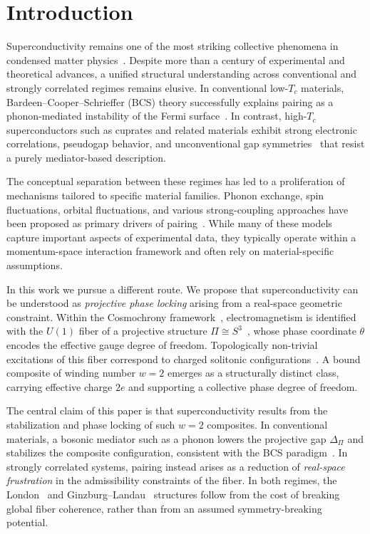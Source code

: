 \section{Introduction}
  \label{sec:introduction}

  Superconductivity remains one of the most striking collective phenomena in condensed matter
  physics~\cite{MeissnerOchsenfeld1933,LondonLondon1935}.
  Despite more than a century of experimental and theoretical advances,
  a unified structural understanding across conventional and strongly correlated regimes
  remains elusive.
  In conventional low-$T_c$ materials, Bardeen--Cooper--Schrieffer (BCS) theory
  successfully explains pairing as a phonon-mediated instability of the Fermi surface~\cite{BCS1957}.
  In contrast, high-$T_c$ superconductors such as cuprates and related materials
  exhibit strong electronic correlations, pseudogap behavior,
  and unconventional gap symmetries~\cite{Timusk1999Pseudogap,Tsuei2000Dwave}
  that resist a purely mediator-based description.

  The conceptual separation between these regimes has led to
  a proliferation of mechanisms tailored to specific material families.
  Phonon exchange, spin fluctuations, orbital fluctuations,
  and various strong-coupling approaches
  have been proposed as primary drivers of pairing~\cite{Scalapino2012SpinFluctuations}.
  While many of these models capture important aspects of experimental data,
  they typically operate within a momentum-space interaction framework
  and often rely on material-specific assumptions.

  In this work we pursue a different route.
  We propose that superconductivity can be understood as
  \emph{projective phase locking}
  arising from a real-space geometric constraint.
  Within the Cosmochrony framework~\cite{CosmochronyMain},
  electromagnetism is identified with the $U(1)$ fiber
  of a projective structure $\Pi \cong S^3$~\cite{CosmochronySpectral},
  whose phase coordinate $\theta$
  encodes the effective gauge degree of freedom.
  Topologically non-trivial excitations of this fiber
  correspond to charged solitonic configurations~\cite{CosmochronyBornInfeld}.
  A bound composite of winding number $w=2$
  emerges as a structurally distinct class,
  carrying effective charge $2e$ and supporting
  a collective phase degree of freedom.

  The central claim of this paper is that superconductivity
  results from the stabilization and phase locking
  of such $w=2$ composites.
  In conventional materials,
  a bosonic mediator such as a phonon
  lowers the projective gap $\Delta_\Pi$
  and stabilizes the composite configuration,
  consistent with the BCS paradigm~\cite{BCS1957}.
  In strongly correlated systems,
  pairing instead arises as a reduction of
  \emph{real-space frustration} in the admissibility
  constraints of the fiber.
  In both regimes,
  the London~\cite{LondonLondon1935}
  and Ginzburg--Landau~\cite{GinzburgLandau1950}
  structures follow from the cost of breaking global fiber coherence,
  rather than from an assumed symmetry-breaking potential.

